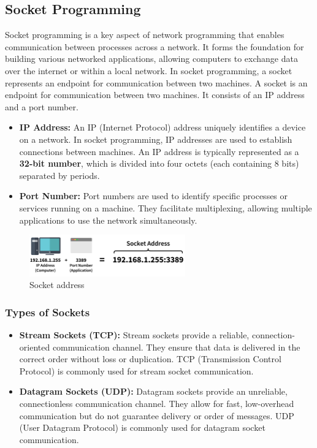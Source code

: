 \newpage
\subsection{Socket Programming}
Socket programming is a key aspect of network programming that enables communication between processes across a network. It forms the foundation for building various networked applications, allowing computers to exchange data over the internet or within a local network. In socket programming, a socket represents an endpoint for communication between two machines. A socket is an endpoint for communication between two machines. It consists of an IP address and a port number.
\begin{itemize}
    \item \textbf{IP Address:} An IP (Internet Protocol) address uniquely identifies a device on a network. In socket programming, IP addresses are used to establish connections between machines. An IP address is typically represented as a \textbf{32-bit number}, which is divided into four octets (each containing 8 bits) separated by periods. 
    \item \textbf{Port Number:} Port numbers are used to identify specific processes or services running on a machine. They facilitate multiplexing, allowing multiple applications to use the network simultaneously.
\end{itemize}

\begin{figure}[h!]
    \centering
    \includegraphics[width=0.6\textwidth]{images/socket_address.png}
    \caption{Socket address}
    \label{fig:example-np-1}
\end{figure}

\subsubsection{Types of Sockets}
\begin{itemize}[leftmargin=*]
    \item \textbf{Stream Sockets (TCP):} Stream sockets provide a reliable, connection-oriented communication channel. They ensure that data is delivered in the correct order without loss or duplication. TCP (Transmission Control Protocol) is commonly used for stream socket communication.
    \item \textbf{Datagram Sockets (UDP):} Datagram sockets provide an unreliable, connectionless communication channel. They allow for fast, low-overhead communication but do not guarantee delivery or order of messages. UDP (User Datagram Protocol) is commonly used for datagram socket communication.
\end{itemize}

